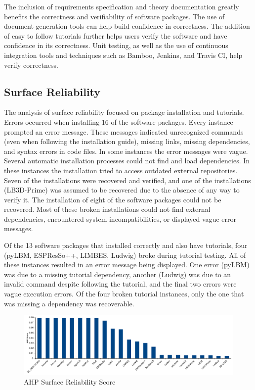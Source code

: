 \documentclass[final, 3p, times, authoryear]{elsarticle}
\begin{document}
The inclusion of requirements specification and theory documentation greatly
benefits the correctness and verifiability of software packages. The use of
document generation tools can help build confidence in correctness. The addition
of easy to follow tutorials further helps users verify the software and have
confidence in its correctness. Unit testing, as well as the use of continuous
integration tools and techniques such as Bamboo, Jenkins, and Travis CI, help
verify correctness.

\subsection{Surface Reliability}

The analysis of surface reliability focused on package installation and
tutorials. Errors occurred when installing 16 of the software packages. Every
instance prompted an error message. These messages indicated unrecognized
commands (even when following the installation guide), missing links, missing
dependencies, and syntax errors in code files. In some instances the error messages
were vague. Several automatic installation processes could not find and load 
dependencies. In these instances the installation tried to access outdated
external repositories. Seven of the installations were recovered and verified,
and one of the installations (LB3D-Prime) was assumed to be recovered due to the
absence of any way to verify it. The installation of eight of the software
packages could not be recovered. Most of these broken installations could not
find external dependencies, encountered system incompatibilities, or displayed
vague error messages. 

Of the 13 software packages that installed correctly and also have tutorials,
four (pyLBM, ESPResSo++, LIMBES, Ludwig) broke during tutorial testing. All of
these instances resulted in an error message being displayed. One error (pyLBM)
was due to a missing tutorial dependency, another (Ludwig) was due to an invalid
command despite following the tutorial, and the final two errors were vague
execution errors. Of the four broken tutorial instances, only the one that was
missing a dependency was recoverable. 

\begin{figure}[h!]
	\begin{center}
		\includegraphics[width=1.0\textwidth]{./figures/reliability_chart.pdf}
		\caption{AHP Surface Reliability Score}
		\label{Fig_Reliability}
	\end{center}
\end{figure}
\end{document}
